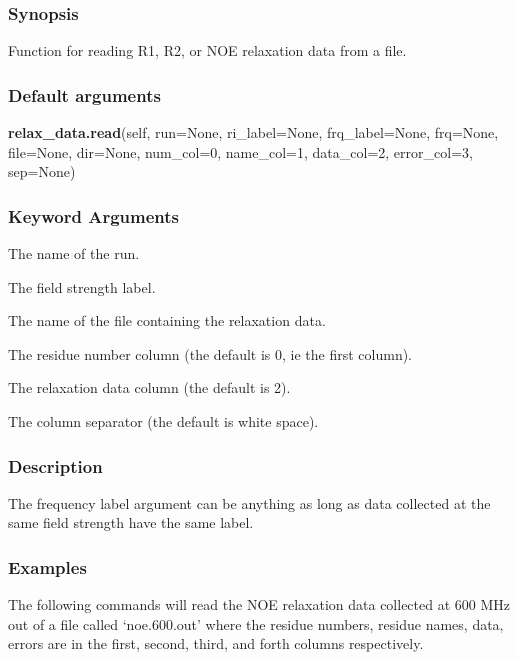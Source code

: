 \subsubsection{Synopsis}

Function for reading R1, R2, or NOE relaxation data from a file.

\subsubsection{Default arguments}

\textsf{\textbf{relax\_data.read}(self, run=None, ri\_label=None, frq\_label=None, frq=None, file=None, dir=None, num\_col=0, name\_col=1, data\_col=2, error\_col=3, sep=None)}


\subsubsection{Keyword Arguments}

  The name of the run.

  The field strength label.

  The name of the file containing the relaxation data.

  The residue number column (the default is 0, ie the first column).

  The relaxation data column (the default is 2).

  The column separator (the default is white space).

\subsubsection{Description}

The frequency label argument can be anything as long as data collected at the same field
strength have the same label.


\subsubsection{Examples}

The following commands will read the NOE relaxation data collected at 600 MHz out of a file
called `noe.600.out' where the residue numbers, residue names, data, errors are in the
first, second, third, and forth columns respectively.




